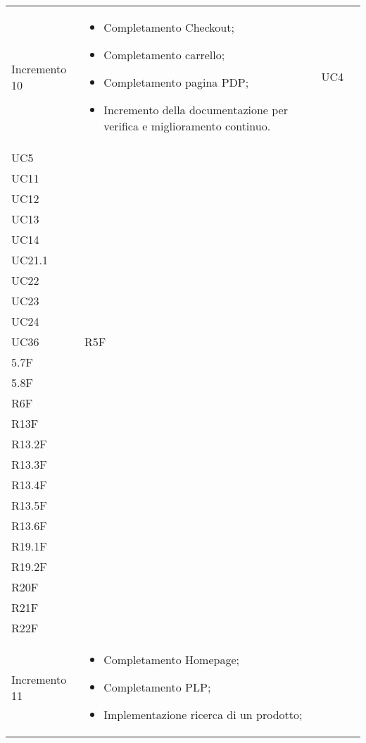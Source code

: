 \begin{longtable}{
    >{\centering}p{}
    >{\raggedright}p{}
    >{\centering}p{}
    >{\centering}p{}
    }
    Incremento 10                 & \vspace{-15px}
    \begin{itemize}
        \renewcommand\labelitemi{-}
        \item Completamento Checkout;
        \item Completamento carrello;
        \item Completamento pagina PDP;
        \item Incremento della documentazione per verifica e miglioramento continuo.
    \end{itemize}    & UC4                                                                                            \\ UC5 \\ UC11                                                                                                                                                                                     \\ UC12 \\UC13\\UC14\\ UC21.1 \\ UC22 \\ UC23 \\ UC24 \\ UC36 & R5F\\5.7F\\5.8F \\ R6F \\ R13F  \\ R13.2F \\R13.3F \\R13.4F \\ R13.5F \\ R13.6F \\ R19.1F \\ R19.2F \\ R20F \\ R21F \\ R22F
    \tabularnewline
    Incremento 11                 & \vspace{-15px}
    \begin{itemize}
        \renewcommand\labelitemi{-}
        \item Completamento Homepage;
        \item Completamento PLP;
        \item Implementazione ricerca di un prodotto;

\end{itemize}
\end{longtable}
